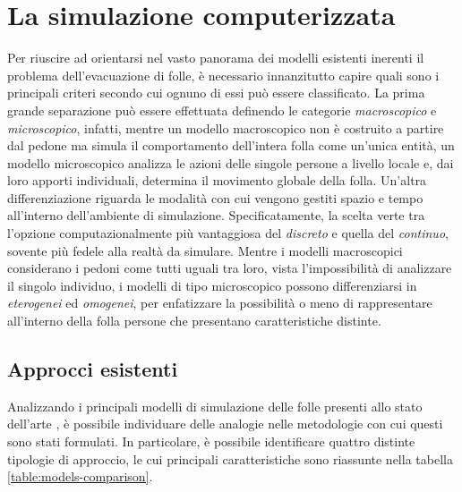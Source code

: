 \section{La simulazione computerizzata}
Per riuscire ad orientarsi nel vasto panorama dei modelli esistenti inerenti il problema dell'evacuazione di folle, è necessario innanzitutto capire quali sono i principali criteri secondo cui ognuno di essi può essere classificato. \newline
La prima grande separazione può essere effettuata definendo le categorie \textit{macroscopico} e \textit{microscopico}, infatti, mentre un modello macroscopico non è costruito a partire dal pedone ma simula il comportamento dell'intera folla come un'unica entità, un modello microscopico analizza le azioni delle singole persone a livello locale e, dai loro apporti individuali, determina il movimento globale della folla. \newline
Un'altra differenziazione riguarda le modalità con cui vengono gestiti spazio e tempo all'interno dell'ambiente di simulazione. Specificatamente, la scelta verte tra l'opzione computazionalmente più vantaggiosa del \textit{discreto} e quella del \textit{continuo}, sovente più fedele alla realtà da simulare. \newline
Mentre i modelli macroscopici considerano i pedoni come tutti uguali tra loro, vista l'impossibilità di analizzare il singolo individuo, i modelli di tipo microscopico possono differenziarsi in \textit{eterogenei} ed \textit{omogenei}, per enfatizzare la possibilità o meno di rappresentare all'interno della folla persone che presentano caratteristiche distinte.

\subsection{Approcci esistenti}
Analizzando i principali modelli di simulazione delle folle presenti allo stato dell'arte \cite{Duives2013} \cite{Zheng2009}, è possibile individuare delle analogie nelle metodologie con cui questi sono stati formulati. In particolare, è possibile identificare quattro distinte tipologie di approccio, le cui principali caratteristiche sono riassunte nella tabella \ref{table:models-comparison}. 

